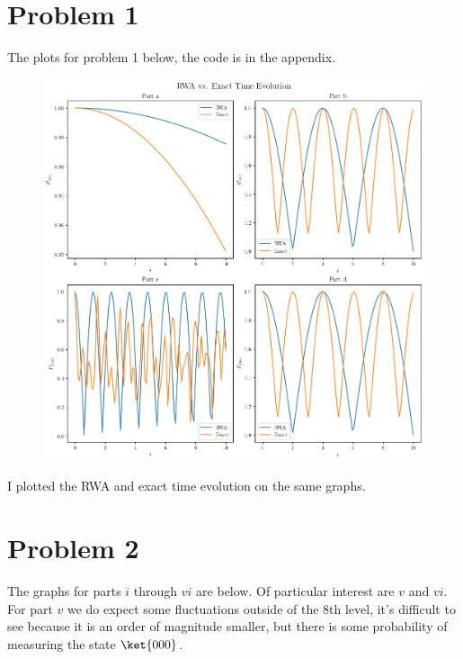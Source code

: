 \section*{Problem 1}
The plots for problem 1 below, the code is in the appendix.
\begin{figure}[h]
    \centering
    \includegraphics[width=1\linewidth]{Resources//245//Homework 7/245 Homework 7 Problem 1.png}
    \label{fig:enter-label}
\end{figure}
I plotted the RWA and exact time evolution on the same graphs.

\pagebreak
\section*{Problem 2}
The graphs for parts $i$ through $vi$ are below. Of particular interest are $v$ and $vi$. For part $v$ we do expect some fluctuations outside of the $8$th level, it's difficult to see because it is an order of magnitude smaller, but there is some probability of measuring the state $\ket{000}$.
\newpage

